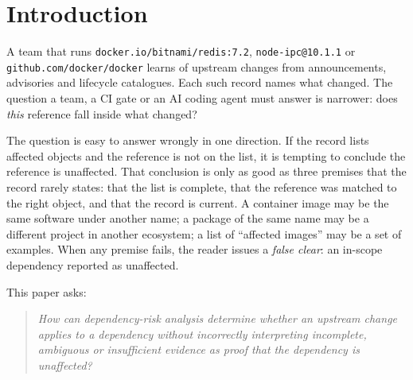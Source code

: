 \documentclass[11pt]{article}
\newcommand{\code}[1]{\texttt{#1}}
\begin{document}
\section{Introduction}

A team that runs \code{docker.io/bitnami/redis:7.2}, \code{node-ipc@10.1.1} or
\code{github.com/docker/docker} learns of upstream changes from announcements,
advisories and lifecycle catalogues. Each such record names what changed. The
question a team, a CI gate or an AI coding agent must answer is narrower: does
\emph{this} reference fall inside what changed?

The question is easy to answer wrongly in one direction. If the record lists
affected objects and the reference is not on the list, it is tempting to
conclude the reference is unaffected. That conclusion is only as good as three
premises that the record rarely states: that the list is complete, that the
reference was matched to the right object, and that the record is current. A
container image may be the same software under another name; a package of the
same name may be a different project in another ecosystem; a list of
``affected images'' may be a set of examples. When any premise fails, the
reader issues a \emph{false clear}: an in-scope dependency reported as
unaffected.

This paper asks:
\begin{quote}
\emph{How can dependency-risk analysis determine whether an upstream change
applies to a dependency without incorrectly interpreting incomplete,
ambiguous or insufficient evidence as proof that the dependency is
unaffected?}
\end{quote}
\end{document}
